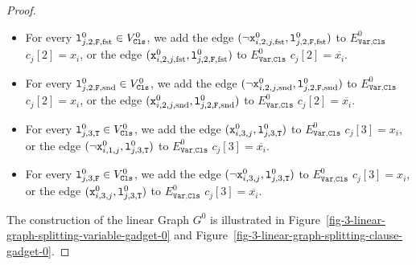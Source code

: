 \begin{proof}
\begin{mdframed}
\begin{itemize}
      \item
      For every $\texttt{l}^{0}_{j, 2, \texttt{F}, \text{fst}} \in V^{0}_{\texttt{Cls}}$, we add
      the edge $(\neg\texttt{x}^{0}_{i,2,j,\text{fst}}, \texttt{l}^{0}_{j, 2, \texttt{F}, \text{fst}})$
      to $E^{0}_{\texttt{Var},\texttt{Cls}}$
      $c_{j}[2] = x_{i}$, or
      the edge $(\texttt{x}^{0}_{i,2,j,\text{fst}}, \texttt{l}^{0}_{j, 2, \texttt{F}, \text{fst}})$
      to $E^{0}_{\texttt{Var},\texttt{Cls}}$
      $c_{j}[2] = \overline{x_{i}}$.

      \item
      For every $\texttt{l}^{0}_{j, 2, \texttt{F}, \text{snd}} \in V^{0}_{\texttt{Cls}}$, we add
      the edge $(\neg\texttt{x}^{0}_{i,2,j,\text{snd}}, \texttt{l}^{0}_{j, 2, \texttt{F}, \text{snd}})$
      to $E^{0}_{\texttt{Var},\texttt{Cls}}$
      $c_{j}[2] = x_{i}$, or
      the edge $(\texttt{x}^{0}_{i,2,j,\text{snd}}, \texttt{l}^{0}_{j, 2, \texttt{F}, \text{snd}})$
      to $E^{0}_{\texttt{Var},\texttt{Cls}}$
      $c_{j}[2] = \overline{x_{i}}$.

      \item
      For every $\texttt{l}^{0}_{j, 3, \texttt{T}} \in V^{0}_{\texttt{Cls}}$,
      we add
      the edge $(\texttt{x}^{0}_{i,3,j}, \texttt{l}^{0}_{j, 3, \texttt{T}})$
      to $E^{0}_{\texttt{Var},\texttt{Cls}}$
      $c_{j}[3] = x_{i}$, or
      the edge $(\neg\texttt{x}^{0}_{i,1,j}, \texttt{l}^{0}_{j, 3, \texttt{T}})$
      to $E^{0}_{\texttt{Var},\texttt{Cls}}$
      $c_{j}[3] = \overline{x_{i}}$.

      \item
      For every $\texttt{l}^{0}_{j, 3, \texttt{F}} \in V^{0}_{\texttt{Cls}}$,
      we add
      the edge $(\neg\texttt{x}^{0}_{i,3,j}, \texttt{l}^{0}_{j, 3, \texttt{T}})$
      to $E^{0}_{\texttt{Var},\texttt{Cls}}$
      $c_{j}[3] = x_{i}$, or
      the edge $(\texttt{x}^{0}_{i,3,j}, \texttt{l}^{0}_{j, 3, \texttt{T}})$
      to $E^{0}_{\texttt{Var},\texttt{Cls}}$
      $c_{j}[3] = \overline{x_{i}}$.
    \end{itemize}
  \end{mdframed}

  \medskip

  The construction of the linear Graph $G^{0}$ is illustrated
  in Figure~\ref{fig-3-linear-graph-splitting-variable-gadget-0} and
  Figure~\ref{fig-3-linear-graph-splitting-clause-gadget-0}.

  

  


\end{proof}
